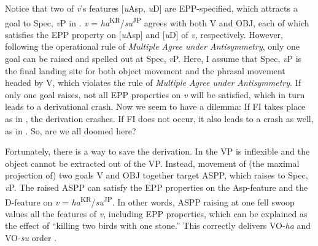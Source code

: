 \ea\label{ex:117}
\vspace*{-10mm}
\z

\clearpage
Notice that two of \textit{v}’s features [\textit{u}Asp, \textit{u}D] are \ac{EPP}-specified, which attracts a goal to Spec, \textit{v}P in . \textit{v} = \textit{ha}\textsuperscript{\MakeUppercase{kr}}/\textit{su}\textsuperscript{\MakeUppercase{jp}} agrees with both V and \acs{OBJ}, each of which satisfies the \ac{EPP} property on [\textit{u}Asp] and [\textit{u}D] of \textit{v}, respectively. However, following the operational rule of \textit{Multiple Agree under Antisymmetry}, only one goal can be raised and spelled out at Spec, \textit{v}P. Here, I assume that Spec, \textit{v}P is the final landing site for both object movement and the phrasal movement headed by V, which violates the rule of  \textit{Multiple Agree under Antisymmetry}. If only one goal raises, not all \ac{EPP} properties on \textit{v} will be satisfied, which in turn leads to a derivational crash. Now we seem to have a dilemma: If \ac{FI} takes place as in , the derivation crashes. If \ac{FI} does not occur, it also leads to a crash as well, as in . So, are we all doomed here? 

Fortunately, there is a way to save the derivation. In  the \acs{VP} is inflexible and the object cannot be extracted out of the \acs{VP}. Instead, movement of (the maximal projection of) two goals V and OBJ together target \ac{ASP}P, which raises to Spec, \textit{v}P. The raised \ac{ASP}P can satisfy the \ac{EPP} properties on the Asp-feature and the D-feature on \textit{v} = \textit{ha}\textsuperscript{\MakeUppercase{kr}}/\textit{su}\textsuperscript{\MakeUppercase{jp}}\MakeUppercase{.} In other words, \ac{ASP}P raising at one fell swoop values all the features of \textit{v}, including \ac{EPP} properties, which can be explained as the effect of ``killing two birds with one stone.'' This correctly delivers \ac{VO}-\textit{ha} and \ac{VO}-\textit{su} order .

